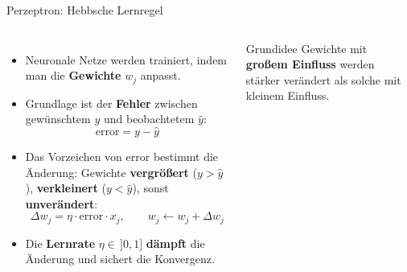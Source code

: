 \begin{frame}{Perzeptron: Hebbsche Lernregel}
\begin{columns}
\begin{itemize}
  \item Neuronale Netze werden trainiert, indem man die \textbf{Gewichte} $w_j$ anpasst.
  \item Grundlage ist der \textbf{Fehler} zwischen gewünschtem $y$ und
        beobachtetem $\hat{y}$:
        \[
          \text{error} = y - \hat{y}
        \]
  \item Das Vorzeichen von $\text{error}$ bestimmt die Änderung: Gewichte
        \textbf{vergrößert} ($y{>}\hat y$), \textbf{verkleinert} ($y{<}\hat y$),
        sonst \textbf{unverändert}:
        \[
          \Delta w_j = \eta\cdot\text{error}\cdot x_j, \qquad w_j \leftarrow w_j + \Delta w_j
        \]
  \item Die \textbf{Lernrate} $\eta \in\, ]0,1]$ \textbf{dämpft} die
        Änderung und sichert die Konvergenz.
\end{itemize}

\begin{blockC1}{Grundidee}
Gewichte mit \textbf{großem Einfluss} werden stärker verändert als solche
mit kleinem Einfluss.
\end{blockC1}
\end{columns}
\end{frame}

